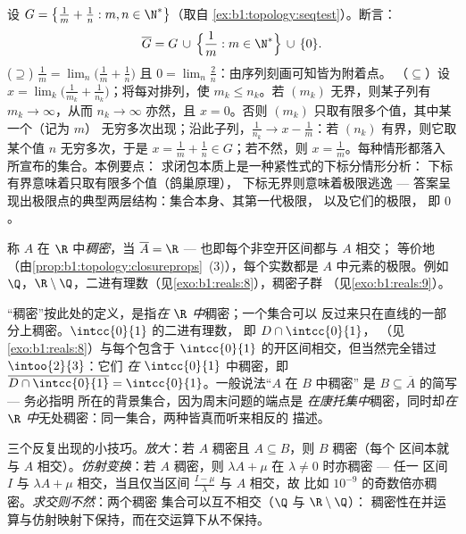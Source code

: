 \begin{example}[精确计算一个闭包]\label{ex:b1:topology:closurecomputed}
设 $G = \bigl\{\frac1m + \frac1n : m, n \in \N^*\bigr\}$（取自
\cref{ex:b1:topology:seqtest}）。断言：
\[
\overline G = G \,\cup\, \Bigl\{\frac1m : m \in \N^*\Bigr\}
\,\cup\, \{0\} .
\]
($\supseteq$) $\frac1m = \lim_n \bigl(\frac1m + \frac1n\bigr)$
且 $0 = \lim_n \frac2n$：由序列刻画可知皆为附着点。
（$\subseteq$）设 $x = \lim_k \bigl(
\frac{1}{m_k} + \frac{1}{n_k}\bigr)$；将每对排列，使
$m_k \leq n_k$。若 $(m_k)$ 无界，则某子列有 $m_k
\to \infty$，从而 $n_k \to \infty$ 亦然，且 $x = 0$。否则
$(m_k)$ 只取有限多个值，其中某一个（记为 $m$）
无穷多次出现；沿此子列，$\frac{1}{n_k} \to x -
\frac1m$：若 $(n_k)$ 有界，则它取某个值 $n$
无穷多次，于是 $x = \frac1m + \frac1n \in G$；若不然，则 $x =
\frac1m$。每种情形都落入所宣布的集合。本例要点：
求闭包本质上是一种紧性式的下标分情形分析：
下标有界意味着只取有限多个值（鸽巢原理），
下标无界则意味着极限逃逸 ---
答案呈现出极限点的典型两层结构：集合本身、其第一代极限，
以及它们的极限，
即 $0$。
\end{example}

\begin{definition}\label{def:b1:topology:dense}
称 $A$ 在 $\R$ 中\emph{稠密}，当 $\overline A = \R$
--- 也即每个非空开区间都与 $A$ 相交；
等价地（由\cref{prop:b1:topology:closureprops}~(3)），每个实数都是
$A$ 中元素的极限。例如 $\Q$，$\R \setminus
\Q$，二进有理数（见\cref{exo:b1:reals:8}），稠密子群
（见\cref{exo:b1:reals:9}）。
\end{definition}

\begin{example}[稠密性是相对的]\label{ex:b1:topology:relativedensity}
“稠密”按此处的定义，是指\emph{在 $\R$ 中}稠密；一个集合可以
反过来只在直线的一部分上稠密。$\intcc{0}{1}$ 的二进有理数，
即 $D \cap \intcc{0}{1}$，
（见\cref{exo:b1:reals:8}）与每个包含于
$\intcc{0}{1}$ 的开区间相交，但当然完全错过 $\intoo{2}{3}$：它们
\emph{在} $\intcc{0}{1}$ 中稠密，即 $\overline{D \cap
\intcc{0}{1}} = \intcc{0}{1}$。一般说法“$A$ 在 $B$ 中稠密”
是 $B \subseteq \overline A$ 的简写 --- 务必指明
所在的背景集合，因为周末问题的端点是
\emph{在康托集中}稠密，同时却\emph{在
$\R$ 中}无处稠密：同一集合，两种皆真而听来相反的
描述。
\end{example}

\begin{example}[稠密性的处理]\label{ex:b1:topology:densitytricks}
三个反复出现的小技巧。\emph{放大}：若
$A$ 稠密且 $A \subseteq B$，则 $B$ 稠密（每个
区间本就与 $A$ 相交）。\emph{仿射变换}：若 $A$
稠密，则 $\lambda A + \mu$ 在 $\lambda \neq 0$ 时亦稠密 --- 任一
区间 $I$ 与 $\lambda A + \mu$ 相交，当且仅当区间
$\frac{I - \mu}{\lambda}$ 与 $A$ 相交，故
比如 $10^{-9}$ 的奇数倍亦稠密。\emph{求交则不然}：两个稠密
集合可以互不相交（$\Q$ 与 $\R \setminus \Q$）：
稠密性在并运算与仿射映射下保持，而在交运算下从不保持。
\end{example}

